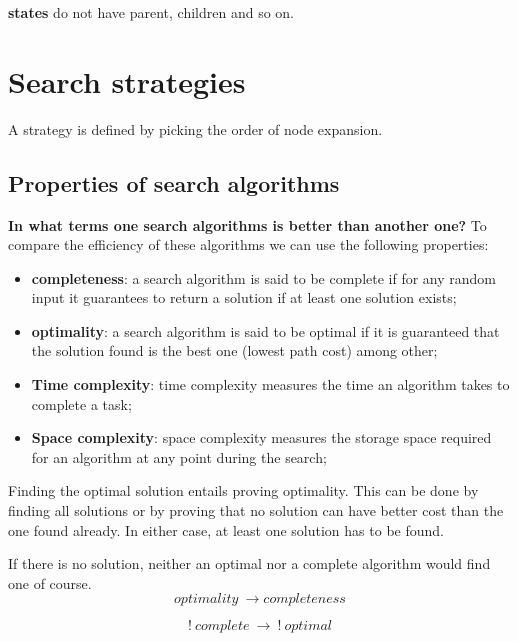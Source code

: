 \documentclass{article}
\begin{document}
\begin{flushleft}
    \textbf{states} do not have parent, children and so on.
\end{flushleft}

\newpage

\section{Search strategies}

A strategy is defined by picking the order of node expansion.

\subsection{Properties of search algorithms}

\textbf{In what terms one search algorithms is better than another one?} To compare the efficiency of these algorithms we can use the following properties:

\begin{itemize}
    \item \textbf{completeness}: a search algorithm is said to be complete if for any random input it guarantees to return a solution if at least one solution exists;
    \item \textbf{optimality}: a search algorithm is said to be optimal if it is guaranteed that the solution found is the best one (lowest path cost) among other; 
    \item \textbf{Time complexity}: time complexity measures the time an algorithm takes to complete a task;
    \item \textbf{Space complexity}: space complexity measures the storage space required for an algorithm at any point during the search;
\end{itemize}

Finding the optimal solution entails proving optimality. This can be done by finding all solutions or by proving that no solution can have better cost than the one found already. In either case, at least one solution has to be found.

If there is no solution, neither an optimal nor a complete algorithm would find one of course.
\begin{equation}
    optimality\ \rightarrow completeness
\end{equation}

\begin{equation}
    !\ complete\ \rightarrow\ !\ optimal
\end{equation}
\end{document}

